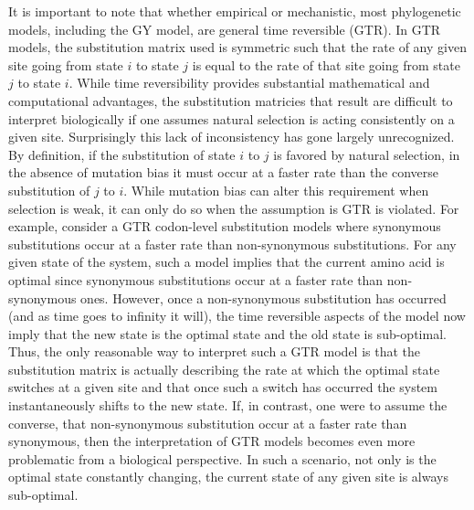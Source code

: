 \documentclass[13pt]{article}
\begin{document}
It is important to note that whether empirical or mechanistic, most phylogenetic models, including the GY model, are general time reversible (GTR).
In GTR models, the substitution matrix used is symmetric such that the rate of any given site going from state $i$ to state $j$ is equal to the rate of that site going from state $j$ to state $i$.
While time reversibility provides substantial mathematical and computational advantages, the substitution matricies that result are difficult to interpret biologically if one assumes natural selection is acting consistently on a given site.
Surprisingly this lack of inconsistency has gone largely unrecognized.
By definition, if the substitution of state $i$ to $j$ is favored by natural selection, in the absence of mutation bias it must occur at a faster rate than the converse substitution of $j$ to $i$.
While mutation bias can alter this requirement when selection is weak, it can only do so when the assumption is GTR is violated.
For example, consider a GTR codon-level substitution models where synonymous substitutions occur at a faster rate than non-synonymous substitutions.
For any given state of the system, such a model implies that the current amino acid is optimal since synonymous substitutions occur at a faster rate than non-synonymous ones.
However, once a non-synonymous substitution has occurred (and as time goes to infinity it will),  the time reversible aspects of the model now imply that the new state is the optimal state and the old state is sub-optimal.
Thus, the only reasonable way to interpret such a GTR model is that the substitution matrix is actually describing the rate at which the optimal state switches at a given site and that once such a switch has occurred the system instantaneously shifts to the new state.
If, in contrast, one were to assume the converse, that non-synonymous substitution occur at a faster rate than synonymous, then the interpretation of GTR models becomes even more problematic from a biological perspective.
In such a scenario, not only is the optimal state constantly changing, the current state of any given site is always sub-optimal.
\end{document}
